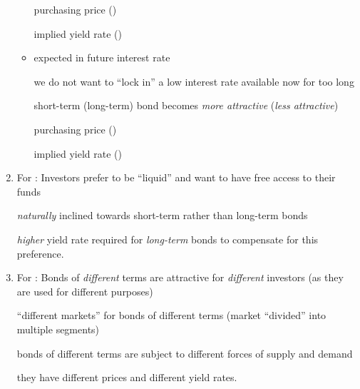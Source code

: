 \begin{enumerate}
\begin{itemize}
 purchasing price  ()

 implied yield rate  ()

\item expected  in future interest rate 

 we do not want to ``lock in'' a low interest rate available now for too long

 short-term (long-term) bond becomes {\color{ForestGreen}\emph{more attractive}}
({\color{red}\emph{less attractive}})

 purchasing price  ()

 implied yield rate  ()
\end{itemize}

\item For : Investors prefer to be ``liquid'' and
want to have free access to their funds

 \emph{naturally} inclined towards short-term
rather than long-term bonds

 \emph{higher} yield rate required for
\emph{long-term} bonds to compensate for this preference.

\item For : Bonds of \emph{different} terms are
attractive for \emph{different} investors (as they are used for different
purposes)

 ``different markets'' for bonds of different
terms (market ``divided'' into multiple segments)

 bonds of different terms are subject to
different forces of supply and demand

 they have different prices and different yield
rates.
\end{enumerate}

